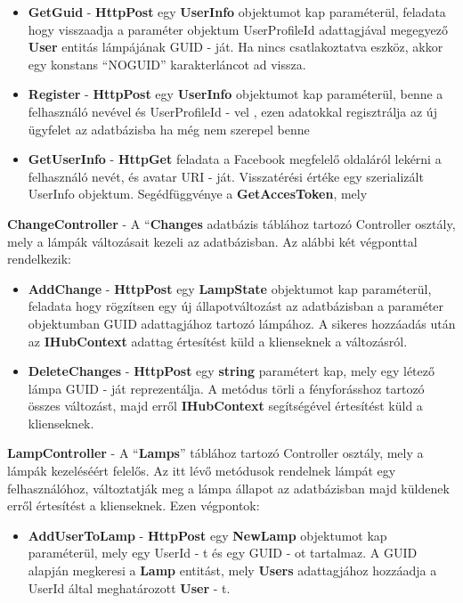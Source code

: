 \documentclass[a4paper,12pt]{report}
\begin{document}
 \begin{itemize}
     \item \textbf{GetGuid} - \textbf{HttpPost} egy \textbf{UserInfo} objektumot kap paraméterül, feladata hogy visszaadja a paraméter
     objektum UserProfileId adattagjával megegyező \textbf{User} entitás lámpájának GUID - ját. Ha nincs csatlakoztatva eszköz,
     akkor egy konstans ``NOGUID'' karakterláncot ad vissza.
     \item \textbf{Register} - \textbf{HttpPost} egy \textbf{UserInfo} objektumot kap paraméterül, benne a felhasználó nevével és UserProfileId - vel
     , ezen adatokkal regisztrálja az új ügyfelet az adatbázisba ha még nem szerepel benne
     \item \textbf{GetUserInfo} - \textbf{HttpGet} feladata a Facebook megfelelő oldaláról lekérni a felhasználó nevét, és avatar URI - ját.
     Visszatérési értéke egy szerializált UserInfo objektum. Segédfüggvénye a \textbf{GetAccesToken}, mely
 \end{itemize}

    \textbf{ChangeController} - A ``\textbf{Changes} adatbázis táblához tartozó Controller osztály, mely a lámpák változásait kezeli az adatbázisban.
    Az alábbi két végponttal rendelkezik:

 \begin{itemize}
     \item \textbf{AddChange} - \textbf{HttpPost} egy \textbf{LampState} objektumot kap paraméterül, feladata hogy rögzítsen egy új állapotváltozást
     az adatbázisban a paraméter objektumban GUID adattagjához tartozó lámpához. A sikeres hozzáadás után az \textbf{IHubContext} adattag értesítést
     küld a klienseknek a változásról.
     \item \textbf{DeleteChanges} - \textbf{HttpPost} egy \textbf{string} paramétert kap, mely egy létező lámpa GUID - ját reprezentálja. A metódus
     törli a fényforásshoz tartozó összes változást, majd erről \textbf{IHubContext} segítségével értesítést küld a klienseknek.
 \end{itemize}

    \textbf{LampController} - A ``\textbf{Lamps}'' táblához tartozó Controller osztály, mely a lámpák kezeléséért felelős. Az itt lévő metódusok
    rendelnek lámpát egy felhasználóhoz, változtatják meg a lámpa állapot az adatbázisban majd küldenek erről értesítést a klienseknek. Ezen végpontok:

\begin{itemize}
    \item \textbf{AddUserToLamp} - \textbf{HttpPost} egy \textbf{NewLamp} objektumot kap paraméterül, mely egy UserId - t és egy GUID - ot tartalmaz.
    A GUID alapján megkeresi a \textbf{Lamp} entitást, mely \textbf{Users} adattagjához hozzáadja a UserId által meghatározott \textbf{User} - t.
\end{itemize}
\end{document}
